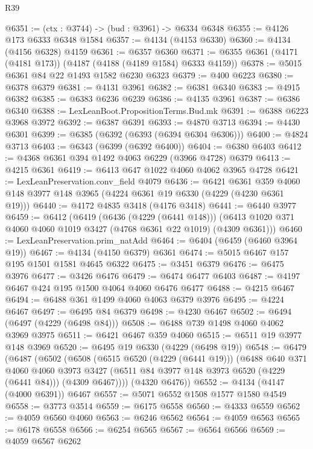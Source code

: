 \begin{lexlean}{R39}
\begin{coremodule}
@6351 := (ctx : @3744) -> (bud : @3961) -> @6334 @6348
@6355 := @4126 @173 @6333 @6348 @1584
@6357 := @4134 (@4153 @6330)
@6360 := @4134 (@4156 @6328) @4159
@6361 := @6357 @6360
@6371 := @6355 @6361 (@4171 (@4181 @173)) (@4187 (@4188 (@4189 @1584) @6333 @4159))
@6378 := @5015 @6361 @84 @22 @1493 @1582 @6230 @6323
@6379 := @400 @6223
@6380 := @6378 @6379
@6381 := @4131 @3961
@6382 := @6381 @6340
@6383 := @4915 @6382
@6385 := @6383 @6236 @6239
@6386 := @4135 @3961
@6387 := @6386 @6340
@6388 := LexLeanBoot.PropositionTerms.Bud.mk
@6391 := @6388 @6223 @3968 @3972
@6392 := @6387 @6391
@6393 := @4870 @3713
@6394 := @4430 @6301
@6399 := @6385 (@6392 (@6393 (@6394 @6304 @6306)))
@6400 := @4824 @3713
@6403 := @6343 (@6399 (@6392 @6400))
@6404 := @6380 @6403
@6412 := @4368 @6361 @394 @1492 @4063 @6229 (@3966 @4728) @6379
@6413 := @4215 @6361
@6419 := @6413 @647 @1022 @4060 @4062 @3965 @4728
@6421 := LexLeanPreservation.conv_field @4079
@6436 := @6421
    @6361
    @359
    @4060
    @148
    @3977
    @148
    @3965
    (@4224 @6361 @19 @6330 (@4229 (@4230 @6361 @19)))
@6440 := @4172 @4835 @3418 (@4176 @3418)
@6441 := @6440 @3977
@6459 := @6412
    (@6419
      (@6436 (@4229 (@6441 @148)))
      (@6413 @1020 @371 @4060 @4060 @1019 @3427 (@4768 @6361 @22 @1019) (@4309 @6361)))
@6460 := LexLeanPreservation.prim_natAdd
@6464 := @6404 (@6459 (@6460 @3964 @19))
@6467 := @4134 (@4150 @6379) @6361
@6474 := @5015 @6467 @157 @195 @1501 @1581 @4645 @6322
@6475 := @3451 @6379
@6476 := @6475 @3976
@6477 := @3426 @6476
@6479 := @6474 @6477 @6403
@6487 := @4197 @6467 @424 @195 @1500 @4064 @4060 @6476 @6477
@6488 := @4215 @6467
@6494 := @6488 @361 @1499 @4060 @4063 @6379 @3976
@6495 := @4224 @6467
@6497 := @6495 @84 @6379
@6498 := @4230 @6467
@6502 := @6494 (@6497 (@4229 (@6498 @84)))
@6508 := @6488 @739 @1498 @4060 @4062 @3969 @3975
@6511 := @6421 @6467 @359 @4060
@6515 := @6511 @19 @3977 @148 @3969
@6520 := @6495 @19 @6330 (@4229 (@6498 @19))
@6548 := @6479
    (@6487
      (@6502
        (@6508
          (@6515 @6520 (@4229 (@6441 @19)))
          (@6488
            @640
            @371
            @4060
            @4060
            @3973
            @3427
            (@6511 @84 @3977 @148 @3973 @6520 (@4229 (@6441 @84)))
            (@4309 @6467))))
      (@4320 @6476))
@6552 := @4134 (@4147 (@4000 @6391)) @6467
@6557 := @5071 @6552 @1508 @1577 @1580 @4549
@6558 := @3773 @3514
@6559 := @6175 @6558
@6560 := @4333 @6559
@6562 := @4059 @6560 @4060
@6563 := @6246 @6562
@6564 := @4059 @6563
@6565 := @6178 @6558
@6566 := @6254 @6565
@6567 := @6564 @6566
@6569 := @4059 @6567 @6262

\end{coremodule}
\end{lexlean}
